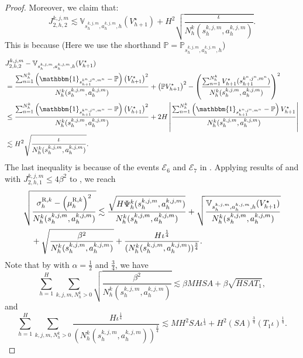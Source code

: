 \documentclass{article}
\newcommand{\R}{\textnormal{R}}
\begin{document}
\begin{proof}
Moreover, we claim that:
\begin{equation}
    \label{j2upper}
    J_{2,h,2}^{k,j,m} \lesssim \mathbb{V}_{s_h^{k,j,m}, a_h^{k,j,m}, h} (V_{h+1}^{\star}) + H^2\sqrt{\frac{\iota}{N_h^k(s_h^{k,j,m}, a_h^{k,j,m})}}.
\end{equation}
This is because (Here we use the shorthand $\mathbb{P} = \mathbb{P}_{s_h^{k,j,m}, a_h^{k,j,m},h}$)
\begin{align*}
    &J_{2,h,2}^{k,j,m} - \mathbb{V}_{s_h^{k,j,m}, a_h^{k,j,m}, h} (V_{h+1}^{\star}) \\
    &= \frac{\sum_{n=1}^{N_h^k}\left(\mathbbm{1}_{s_{h+1}^{k^n,j^n,m^n}}-\mathbb{P}\right)\left(V_{h+1}^{\star}\right)^2}{N_h^k(s_h^{k,j,m}, a_h^{k,j,m})} + \left(\mathbb{P}V_{h+1}^{\star}\right)^2 - \left(\frac{\sum_{n=1}^{N_h^k}V_{h+1}^{\star}(s_{h+1}^{k^n,j^n,m^n})}{N_h^k(s_h^{k,j,m}, a_h^{k,j,m})}\right)^2 \\
    & \leq \frac{\sum_{n=1}^{N_h^k}\left(\mathbbm{1}_{s_{h+1}^{k^n,j^n,m^n}}-\mathbb{P}\right)\left(V_{h+1}^{\star}\right)^2}{N_h^k(s_h^{k,j,m}, a_h^{k,j,m})} + 2H\left| \frac{\sum_{n=1}^{N_h^k}\left(\mathbbm{1}_{s_{h+1}^{k^n,j^n,m^n}}-\mathbb{P}\right)V_{h+1}^{\star}}{N_h^k(s_h^{k,j,m}, a_h^{k,j,m})}\right|\\
    &\lesssim H^2\sqrt{\frac{\iota}{N_h^k(s_h^{k,j,m}, a_h^{k,j,m})}} .
\end{align*}
The last inequality is because of the events $\mathcal{E}_6$ and $\mathcal{E}_7$ in . Applying results of  and  with $J_{2,h,1}^{k,j,m} \leq 4\beta^2$ to , we reach
\begin{align}
 &\sqrt{\frac{\sigma_h^{\R,k} - \left(\mu_h^{\R,k}\right)^2}{N_h^k(s_h^{k,j,m}, a_h^{k,j,m})}} \lesssim \frac{\sqrt{H\Psi_h^k(s_h^{k,j,m}, a_h^{k,j,m})}}{N_h^k(s_h^{k,j,m}, a_h^{k,j,m})} + \sqrt{\frac{\mathbb{V}_{s_h^{k,j,m}, a_h^{k,j,m}, h} (V_{h+1}^{\star})}{N_h^k(s_h^{k,j,m}, a_h^{k,j,m})}} \nonumber\\
 &\quad + \sqrt{\frac{\beta^2}{N_h^k(s_h^{k,j,m}, a_h^{k,j,m})}}+ \frac{H\iota^{\frac{1}{4}}} {(N_h^k(s_h^{k,j,m}, a_h^{k,j,m}))^{\frac{3}{4}}}. \label{singlerefupper}
\end{align}
Note that by  with $\alpha = \frac{1}{2}$ and $\frac{3}{4}$, we have
$$\sum_{h=1}^H\sum_{k,j,m,N_h^k >0}\sqrt{\frac{\beta^2}{N_h^k(s_h^{k,j,m}, a_h^{k,j,m})}} \lesssim \beta MHSA + \beta \sqrt{HSAT_1},$$
and
$$\sum_{h=1}^H\sum_{k,j,m,N_h^k >0}\frac{H\iota^{\frac{1}{4}}}{(N_h^k(s_h^{k,j,m}, a_h^{k,j,m}))^{\frac{3}{4}}} \lesssim MH^2SA\iota^{\frac{1}{4}}+ H^2(SA)^{\frac{3}{4}}(T_1\iota)^{\frac{1}{4}}.$$

\end{proof}
\end{document}
